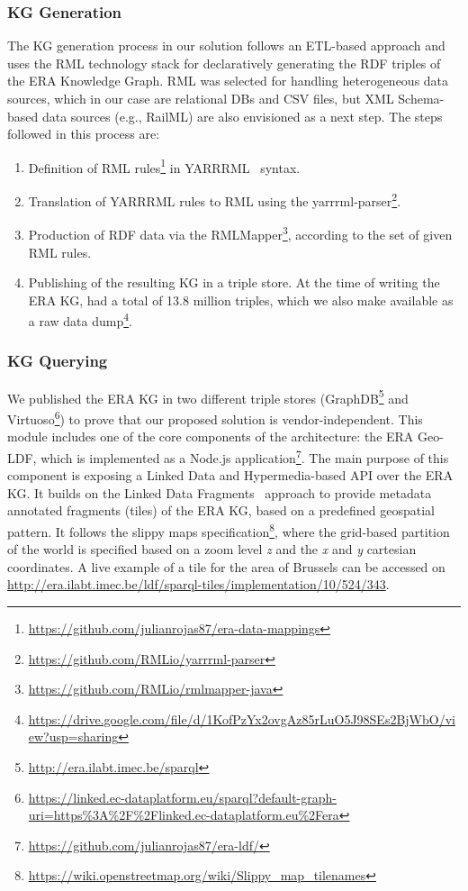 \subsubsection{KG Generation}
The KG generation process in our solution
follows an ETL-based approach and uses the RML\cite{dimou2014} technology stack
for declaratively generating the RDF triples of the ERA Knowledge Graph.
RML was selected for handling heterogeneous data sources,
which in our case are relational DBs and CSV files,
but XML Schema-based data sources (e.g., RailML) are also envisioned as a next step.
The steps followed in this process are:

\begin{enumerate}
\item Definition of RML 
rules\footnote{\url{https://github.com/julianrojas87/era-data-mappings}} 
in YARRRML~\cite{heyvaert2018} syntax.
\item Translation of YARRRML rules
to RML using the yarrrml-parser\footnote{\url{https://github.com/RMLio/yarrrml-parser}}.
\item Production of RDF data via the RMLMapper\footnote{\url{https://github.com/RMLio/rmlmapper-java}}, 
according to the set of given RML rules.
\item Publishing of the resulting KG in a triple store. 
At the time of writing the ERA KG, had a total of 13.8 million triples, 
which we also make available as a raw data 
dump\footnote{\url{https://drive.google.com/file/d/1KofPzYx2ovgAz85rLuO5J98SEs2BjWbO/view?usp=sharing}}.
\end{enumerate}

\subsubsection{KG Querying}
We published the ERA KG in two different triple stores
(GraphDB\footnote{\url{http://era.ilabt.imec.be/sparql}}
and Virtuoso\footnote{\url{https://linked.ec-dataplatform.eu/sparql?default-graph-uri=https\%3A\%2F\%2Flinked.ec-dataplatform.eu\%2Fera}})
to prove that our proposed solution is vendor-independent.
This module includes one of the core components of the architecture:
the ERA Geo-LDF, which is implemented as a Node.js 
application\footnote{\url{https://github.com/julianrojas87/era-ldf/}}.
The main purpose of this component is exposing a Linked Data
and Hypermedia-based API over the ERA KG.
It builds on the Linked Data Fragments~\cite{verborgh2014} approach
to provide metadata annotated fragments (tiles) of the ERA KG,
based on a predefined geospatial pattern.
It follows the slippy maps 
specification\footnote{\url{https://wiki.openstreetmap.org/wiki/Slippy_map_tilenames}},
where the grid-based partition of the world
is specified based on a zoom level \textit{z} and the \textit{x} 
and \textit{y} cartesian coordinates.
A live example of a tile for the area of Brussels can be accessed 
on \url{http://era.ilabt.imec.be/ldf/sparql-tiles/implementation/10/524/343}.

